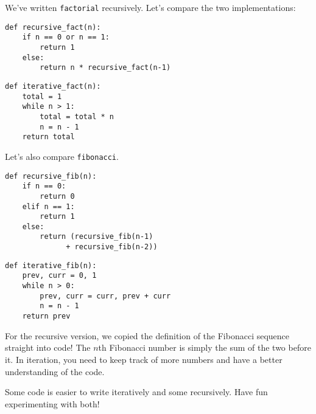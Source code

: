 We've written {\tt factorial} recursively. Let's compare the two implementations:

\begin{minipage}{0.5\linewidth}
\begin{lstlisting}[linewidth=\linewidth]
def recursive_fact(n):
    if n == 0 or n == 1:
        return 1
    else:
        return n * recursive_fact(n-1)
\end{lstlisting}
\end{minipage}%
\begin{minipage}{0.5\linewidth}
\begin{lstlisting}[linewidth=\linewidth]
def iterative_fact(n):
    total = 1
    while n > 1:
        total = total * n
        n = n - 1
    return total
\end{lstlisting}
\end{minipage}

Let's also compare {\tt fibonacci}.

\begin{minipage}{0.5\linewidth}
\begin{lstlisting}[linewidth=\linewidth]
def recursive_fib(n):
    if n == 0:
        return 0
    elif n == 1:
        return 1
    else:
        return (recursive_fib(n-1)
              + recursive_fib(n-2))
\end{lstlisting}
\end{minipage}%
\begin{minipage}{0.5\linewidth}
\begin{lstlisting}[linewidth=\linewidth]
def iterative_fib(n):
    prev, curr = 0, 1
    while n > 0:
        prev, curr = curr, prev + curr
        n = n - 1
    return prev
\end{lstlisting}
\end{minipage}

For the recursive version, we copied the definition of the Fibonacci sequence straight into code! The $n$th Fibonacci number is simply the sum of the two before it. In iteration, you need to keep track of more numbers and have a better understanding of the code.

Some code is easier to write iteratively and some recursively. Have fun experimenting with both!
